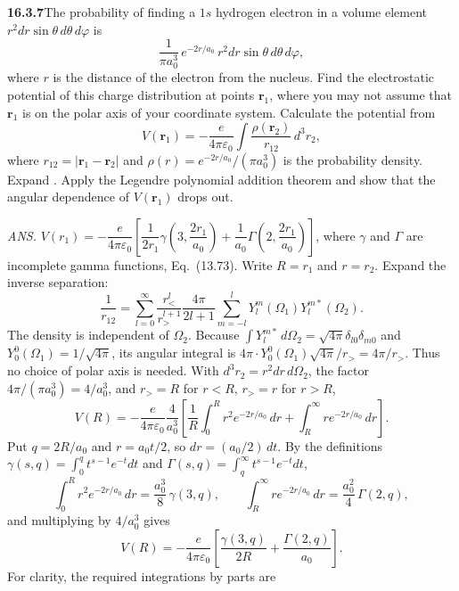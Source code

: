\par\bigskip
\noindent\textbf{16.3.7}\quad The probability of finding a $1s$
hydrogen electron in a volume element
$r^{2}dr\sin\theta\,d\theta\,d\varphi$ is
\[
\frac{1}{\pi a_{0}^{3}}\,e^{-2r/a_{0}}\,
r^{2}dr\sin\theta\,d\theta\,d\varphi,
\]
where $r$ is the distance of the electron from the nucleus. Find the
electrostatic potential of this charge distribution at points
$\mathbf{r}_{1}$, where you may not assume that $\mathbf{r}_{1}$ is
on the polar axis of your coordinate system. Calculate the potential
from
\[
V(\mathbf{r}_{1})=-\frac{e}{4\pi\varepsilon_{0}}
\int\frac{\rho(\mathbf{r}_{2})}{r_{12}}\,d^{3}r_{2},
\]
where $r_{12}=|\mathbf{r}_{1}-\mathbf{r}_{2}|$ and
$\rho(r)=e^{-2r/a_0}/(\pi a_0^3)$ is the probability density.
Expand .
Apply the Legendre polynomial addition theorem and show that the
angular dependence of $V(\mathbf{r}_{1})$ drops out.
\par\nobreak\hfill\emph{ANS.}\enspace
$V(r_{1})=-\dfrac{e}{4\pi\varepsilon_{0}}
\left[\dfrac{1}{2r_{1}}\gamma\left(3,\dfrac{2r_{1}}{a_{0}}\right)
+\dfrac{1}{a_{0}}\Gamma\left(2,\dfrac{2r_{1}}{a_{0}}\right)\right]$, where
$\gamma$ and $\Gamma$ are incomplete gamma functions, Eq.~(13.73).
\solution
{}
Write $R=r_1$ and $r=r_2$. Expand the inverse separation:
\[
\frac1{r_{12}}=\sum_{l=0}^{\infty}\frac{r_<^l}{r_>^{l+1}}
\frac{4\pi}{2l+1}\sum_{m=-l}^{l}
Y_l^m(\Omega_1)Y_l^{m*}(\Omega_2).
\]
The density is independent of $\Omega_2$. Because
$\int Y_l^{m*}\,d\Omega_2=\sqrt{4\pi}\delta_{l0}\delta_{m0}$
and $Y_0^0(\Omega_1)=1/\sqrt{4\pi}$, its angular integral is
$4\pi\cdot Y_0^0(\Omega_1)\sqrt{4\pi}/r_>=4\pi/r_>$. Thus no choice of
polar axis is needed. With $d^3r_2=r^2dr\,d\Omega_2$, the factor
$4\pi/(\pi a_0^3)=4/a_0^3$, and $r_>=R$ for $r<R$, $r_>=r$ for $r>R$,
\[
V(R)=-\frac{e}{4\pi\varepsilon_0}\frac4{a_0^3}
\left[\frac1R\int_0^R r^2e^{-2r/a_0}\,dr
+\int_R^\infty re^{-2r/a_0}\,dr\right].
\]
Put $q=2R/a_0$ and $r=a_0t/2$, so $dr=(a_0/2)\,dt$. By the definitions
$\gamma(s,q)=\int_0^q t^{s-1}e^{-t}dt$ and
$\Gamma(s,q)=\int_q^\infty t^{s-1}e^{-t}dt$,
\[
\int_0^R r^2e^{-2r/a_0}\,dr=\frac{a_0^3}{8}\,\gamma(3,q),\qquad
\int_R^\infty re^{-2r/a_0}\,dr=\frac{a_0^2}{4}\,\Gamma(2,q),
\]
and multiplying by $4/a_0^3$ gives
\[
\boxed{V(R)=-\frac{e}{4\pi\varepsilon_0}
\left[\frac{\gamma(3,q)}{2R}+\frac{\Gamma(2,q)}{a_0}\right]}.
\]
For clarity, the required integrations by parts are
